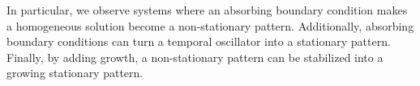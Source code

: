 In particular, we observe systems where an absorbing boundary condition makes a homogeneous solution become a non-stationary pattern.
Additionally, absorbing boundary conditions can turn a temporal oscillator into a stationary pattern.
Finally, by adding growth, a non-stationary pattern can be stabilized into a growing stationary pattern.

